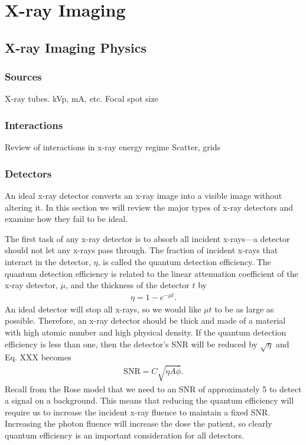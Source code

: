 \documentclass[mphy386-notes.tex]{subfiles}
\begin{document}
\section{X-ray Imaging}
\subsection{X-ray Imaging Physics}
\subsubsection{Sources}
X-ray tubes.
kVp, mA, etc.
Focal spot size

\subsubsection{Interactions}
Review of interactions in x-ray energy regime
Scatter, grids

\subsubsection{Detectors}
An ideal x-ray detector converts an x-ray image into a visible image without
altering it. In this section we will review the major types of x-ray detectors
and examine how they fail to be ideal.

The first task of any x-ray detector is to absorb all incident x-rays---a
detector should not let any x-rays pass through. The fraction of incident x-rays
that interact in the detector, $\eta$, is called the quantum detection
efficiency. The quantum detection efficiency is related to the linear
attenuation coefficient of the x-ray detector, $\mu$, and the thickness of the detector $t$ by
\begin{align}
  \eta = 1 - e^{-\mu t}. 
\end{align}
An ideal detector will stop all x-rays, so we would like $\mu t$ to be as large
as possible. Therefore, an x-ray detector should be thick and made of a material
with high atomic number and high physical density. If the quantum detection
efficiency is less than one, then the detector's SNR will be reduced by
$\sqrt{\eta}$ and Eq. XXX becomes
\begin{align}
  \text{SNR} = C\sqrt{\eta A\bar{\phi}}.
\end{align}
Recall from the Rose model that we need to an SNR of approximately 5 to detect a
signal on a background. This means that reducing the quantum efficiency will
require us to increase the incident x-ray fluence to maintain a fixed SNR.
Increasing the photon fluence will increase the dose the patient, so clearly
quantum efficiency is an important consideration for all detectors.
\end{document}
